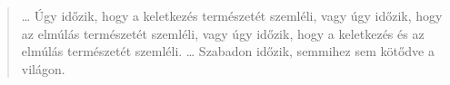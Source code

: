 \begin{quote}
\ldots{} Úgy időzik, hogy a keletkezés természetét szemléli, vagy úgy
időzik, hogy az elmúlás természetét szemléli, vagy úgy időzik, hogy a
keletkezés és az elmúlás természetét szemléli. \ldots{} Szabadon időzik,
semmihez sem kötődve a világon.

\bigskip

\end{quote}
